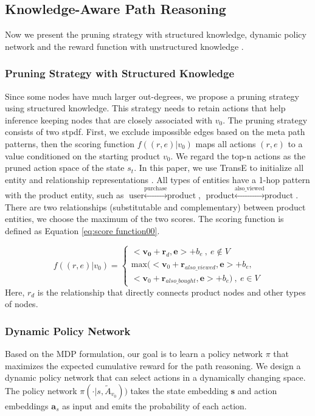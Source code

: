 \documentclass[review]{elsarticle}
\begin{document}
\begin{sloppypar}
\subsection{Knowledge-Aware Path Reasoning}
\label{reasoning}
Now we present the pruning strategy with structured knowledge, dynamic policy network and the reward function with unstructured knowledge .

\subsubsection{Pruning Strategy with Structured Knowledge}
Since some nodes have much larger out-degrees, we propose a pruning strategy using structured knowledge.
This strategy needs to retain actions that help inference keeping nodes that are closely associated with $v_{0}$.
The pruning strategy consists of two stpdf. 
First, we exclude impossible edges based on the meta path patterns, then the scoring function $f((r, e) | v_{0})$ maps all actions $(r, e)$ to a value conditioned on the starting product $v_{0}$. We regard the top-n actions as the pruned action space of the state $s_{t}$.
In this paper, we use TransE to initialize all entity and relationship representations \cite{bordes2013translating_TransE}.
All types of entities have a 1-hop pattern with the product entity, such as $\text{user}\stackrel{\text{purchase}}{\longleftrightarrow}\text{product}$, $\text{product}\stackrel{\text{also\_viewed}}{\longleftrightarrow}\text{product}$.
There are two relationships (substitutable and complementary) between product entities, we choose the maximum of the two scores. The scoring function is defined as Equation \ref{eq:score function00}.

\begin{equation}
\label{eq:score function00}
    f((r,e) | v_{0})=
\begin{cases}
<\mathbf {v_{0}}+\mathbf r_{d},\mathbf e>+b_{e}\ ,\ e \notin V\\
\text{max}(<\mathbf v_{0}+\mathbf r_{also\_viewed},\mathbf e>+b_{e},\\<\mathbf v_{0}+\mathbf r_{also\_bought},\mathbf e>+b_{e})\ ,\ e \in V
\end{cases}
\end{equation}
Here, $r_{d}$ is the relationship that directly connects product nodes and other types of nodes.


\subsubsection{Dynamic Policy Network}
Based on the MDP formulation, our goal is to learn a policy network $\pi$ that maximizes the expected cumulative reward for the path reasoning.
We design a dynamic policy network that can select actions in a dynamically changing space. 
The policy network $\pi(\cdot|s,\tilde{A}_{v_{0}}))$ takes the state embedding $\mathbf s$ and action embeddings $\mathbf a_{s}$ as input and emits the probability of each action. 


\end{sloppypar}
\end{document}
